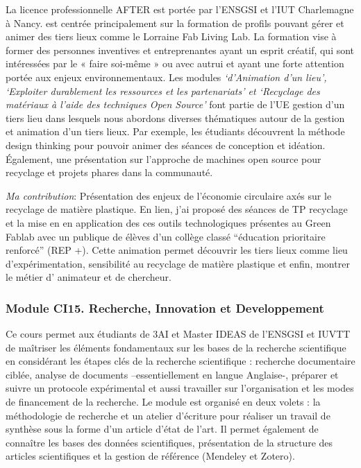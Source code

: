 \documentclass[
  11pt,
]{article}
\begin{document}
La licence professionnelle AFTER est portée par l'ENSGSI et l'IUT
Charlemagne à Nancy. est centrée principalement sur la formation de
profils pouvant gérer et animer des tiers lieux comme le Lorraine Fab
Living Lab. La formation vise à former des personnes inventives et
entreprenantes ayant un esprit créatif, qui sont intéressées par le «
faire soi-même » ou avec autrui et ayant une forte attention portée aux
enjeux environnementaux. Les modules \emph{`d'Animation d'un lieu',
`Exploiter durablement les ressources et les partenariats' et `Recyclage
des matériaux à l'aide des techniques Open Source'} font partie de l'UE
gestion d'un tiers lieu dans lesquels nous abordons diverses thématiques
autour de la gestion et animation d'un tiers lieux. Par exemple, les
étudiants découvrent la méthode design thinking pour pouvoir animer des
séances de conception et idéation. Également, une présentation sur
l'approche de machines open source pour recyclage et projets phares dans
la communauté.

\emph{Ma contribution}: Présentation des enjeux de l'économie circulaire
axés sur le recyclage de matière plastique. En lien, j'ai proposé des
séances de TP recyclage et la mise en en application des ces outils
technologiques présentes au Green Fablab avec un publique de élèves d'un
collège classé ``éducation prioritaire renforcé'' (REP +). Cette
animation permet découvrir les tiers lieux comme lieu d'expérimentation,
sensibilité au recyclage de matière plastique et enfin, montrer le
métier d' animateur et de chercheur.

\hypertarget{module-ci15.-recherche-innovation-et-developpement}{%
\subsubsection{Module CI15. Recherche, Innovation et
Developpement}\label{module-ci15.-recherche-innovation-et-developpement}}

Ce cours permet aux étudiants de 3AI et Master IDEAS de l'ENSGSI et
IUVTT de maîtriser les éléments fondamentaux sur les bases de la
recherche scientifique en considérant les étapes clés de la recherche
scientifique : recherche documentaire ciblée, analyse de documents
--essentiellement en langue Anglaise-, préparer et suivre un protocole
expérimental et aussi travailler sur l'organisation et les modes de
financement de la recherche. Le module est organisé en deux volets : la
méthodologie de recherche et un atelier d'écriture pour réaliser un
travail de synthèse sous la forme d'un article d'état de l'art. Il
permet également de connaître les bases des données scientifiques,
présentation de la structure des articles scientifiques et la gestion de
référence (Mendeley et Zotero).
\end{document}
